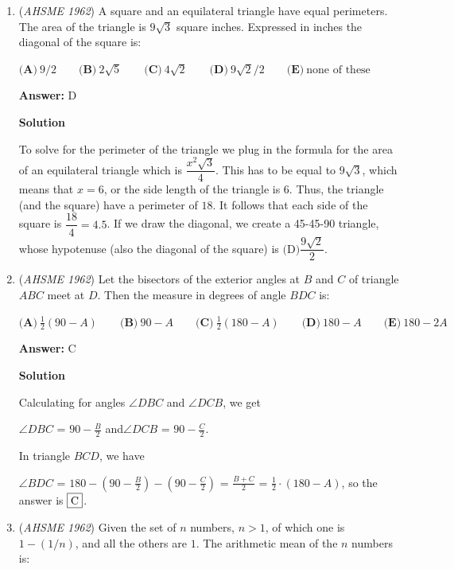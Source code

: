 \begin{enumerate}
 


	\item (\textit{AHSME 1962}) A square and an equilateral triangle have equal perimeters. The area of the triangle is $9\sqrt{3}$ square inches. Expressed in inches the diagonal of the square is:


 $\textbf{(A)}\ 9/2 \qquad  \textbf{(B)}\ 2\sqrt{5} \qquad  \textbf{(C)}\ 4\sqrt{2} \qquad  \textbf{(D)}\ 9\sqrt{2}/2 \qquad  \textbf{(E)}\ \text{none of these}$

 \textbf{Answer: }D



\textbf{Solution}

To solve for the perimeter of the triangle we plug in the formula for the area of an equilateral triangle which is $\dfrac{x^2\sqrt{3}}{4}$. This has to be equal to $9 \sqrt{3}$, which means that $x=6$, or the side length of the triangle is $6$. Thus, the triangle (and the square) have a perimeter of $18$. It follows that each side of the square is $\dfrac{18}{4}=4.5$. If we draw the diagonal, we create a 45-45-90 triangle, whose hypotenuse (also the diagonal of the square) is $\boxed{\text{(D)} \dfrac{9\sqrt{2}}{2}}$.

 


	\item (\textit{AHSME 1962}) Let the bisectors of the exterior angles at $B$ and $C$ of triangle $ABC$ meet at $D$. Then the measure in degrees of angle $BDC$ is:


 $\textbf{(A)}\ \frac{1}{2}(90 - A) \qquad  \textbf{(B)}\ 90 - A \qquad  \textbf{(C)}\ \frac{1}{2}(180 - A) \qquad  \textbf{(D)}\ 180 - A \qquad  \textbf{(E)}\ 180 - 2A$

 \textbf{Answer: }C



\textbf{Solution}

Calculating for angles $\angle DBC$ and $\angle DCB$, we get

 $\angle DBC$ = $90 - \frac{B}{2}$ and$\angle DCB$ = $90 - \frac{C}{2}$.

 In triangle $BCD$, we have

 $\angle BDC$ = $180 - (90 - \frac{B}{2}) - (90 - \frac{C}{2})$ = $\frac{B+C}{2}$ = $\frac{1}{2}\cdot(180 - A)$, so the answer is $\fbox{C}$.

 


	\item (\textit{AHSME 1962}) Given the set of $n$ numbers, $n > 1$, of which one is $1 - (1/n)$, and all the others are $1$. The arithmetic mean of the $n$ numbers is:



\end{enumerate}
